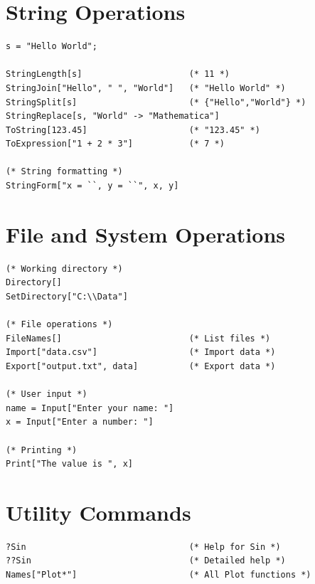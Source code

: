 \documentclass[12pt,a4paper]{article}
\begin{document}
\section{String Operations}

\begin{commandbox}
\begin{lstlisting}
s = "Hello World";

StringLength[s]                     (* 11 *)
StringJoin["Hello", " ", "World"]   (* "Hello World" *)
StringSplit[s]                      (* {"Hello","World"} *)
StringReplace[s, "World" -> "Mathematica"]
ToString[123.45]                    (* "123.45" *)
ToExpression["1 + 2 * 3"]           (* 7 *)

(* String formatting *)
StringForm["x = ``, y = ``", x, y]
\end{lstlisting}
\end{commandbox}

\section{File and System Operations}

\begin{commandbox}[File I/O]
\begin{lstlisting}
(* Working directory *)
Directory[]
SetDirectory["C:\\Data"]

(* File operations *)
FileNames[]                         (* List files *)
Import["data.csv"]                  (* Import data *)
Export["output.txt", data]          (* Export data *)

(* User input *)
name = Input["Enter your name: "]
x = Input["Enter a number: "]

(* Printing *)
Print["The value is ", x]
\end{lstlisting}
\end{commandbox}

\section{Utility Commands}

\begin{commandbox}
\begin{lstlisting}
?Sin                                (* Help for Sin *)
??Sin                               (* Detailed help *)
Names["Plot*"]                      (* All Plot functions *)
\end{lstlisting}
\end{commandbox}
\end{document}
